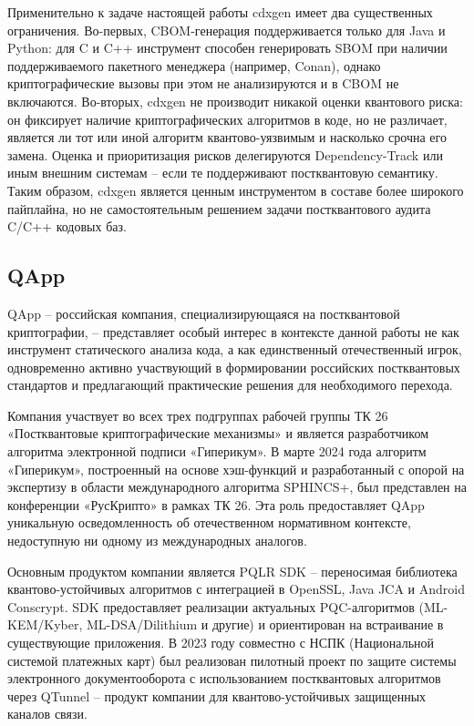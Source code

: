 \documentclass{itmo-vkr}
\begin{document}
	Применительно к задаче настоящей работы cdxgen имеет два существенных ограничения. Во-первых, CBOM-генерация поддерживается только для Java и Python: для C и C++ инструмент способен генерировать SBOM при наличии поддерживаемого пакетного менеджера (например, Conan), однако криптографические вызовы при этом не анализируются и в CBOM не включаются. Во-вторых, cdxgen не производит никакой оценки квантового риска: он фиксирует наличие криптографических алгоритмов в коде, но не различает, является ли тот или иной алгоритм квантово-уязвимым и насколько срочна его замена. Оценка и приоритизация рисков делегируются Dependency-Track или иным внешним системам -- если те поддерживают постквантовую семантику. Таким образом, cdxgen является ценным инструментом в составе более широкого пайплайна, но не самостоятельным решением задачи постквантового аудита C/C++ кодовых баз.
	
	\subsection{QApp}
	
	QApp -- российская компания, специализирующаяся на постквантовой криптографии, -- представляет особый интерес в контексте данной работы не как инструмент статического анализа кода, а как единственный отечественный игрок, одновременно активно участвующий в формировании российских постквантовых стандартов и предлагающий практические решения для необходимого перехода.
	
	Компания участвует во всех трех подгруппах рабочей группы ТК 26 «Постквантовые криптографические механизмы» и является разработчиком алгоритма электронной подписи «Гиперикум». В марте 2024 года алгоритм «Гиперикум», построенный на основе хэш-функций и разработанный с опорой на экспертизу в области международного алгоритма SPHINCS+, был представлен на конференции «РусКрипто» в рамках ТК 26. Эта роль предоставляет QApp уникальную осведомленность об отечественном нормативном контексте, недоступную ни одному из международных аналогов.
	
	Основным продуктом компании является PQLR SDK -- переносимая библиотека квантово-устойчивых алгоритмов с интеграцией в OpenSSL, Java JCA и Android Conscrypt. SDK предоставляет реализации актуальных PQC-алгоритмов (ML-KEM/Kyber, ML-DSA/Dilithium и другие) и ориентирован на встраивание в существующие приложения. В 2023 году совместно с НСПК (Национальной системой платежных карт) был реализован пилотный проект по защите системы электронного документооборота с использованием постквантовых алгоритмов через QTunnel -- продукт компании для квантово-устойчивых защищенных каналов связи.
	
\end{document}
